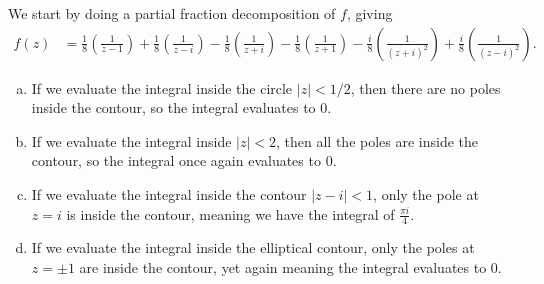 \documentclass[10pt]{mypackage}
\begin{document}
\begin{solution}[21.10]
  We start by doing a partial fraction decomposition of $f$, giving
  \begin{align*}
    f(z) &= \frac{1}{8}\left( \frac{1}{z-1} \right)  + \frac{1}{8}\left( \frac{1}{z-i} \right) - \frac{1}{8}\left( \frac{1}{z+i} \right)- \frac{1}{8}\left( \frac{1}{z+1} \right) - \frac{i}{8}\left( \frac{1}{\left( z+i \right)^2} \right) + \frac{i}{8}\left( \frac{1}{\left( z-i \right)^2} \right).
  \end{align*}
  \begin{enumerate}[(a)]
    \item If we evaluate the integral inside the circle $\left\vert z \right\vert < 1/2$, then there are no poles inside the contour, so the integral evaluates to $0$.
    \item If we evaluate the integral inside $\left\vert z \right\vert < 2$, then all the poles are inside the contour, so the integral once again evaluates to $0$.
    \item If we evaluate the integral inside the contour $\left\vert z-i \right\vert < 1$, only the pole at $z = i$ is inside the contour, meaning we have the integral of $\frac{\pi i}{4}$.
    \item If we evaluate the integral inside the elliptical contour, only the poles at $z = \pm 1$ are inside the contour, yet again meaning the integral evaluates to $0$.
  \end{enumerate}
\end{solution}
\end{document}
